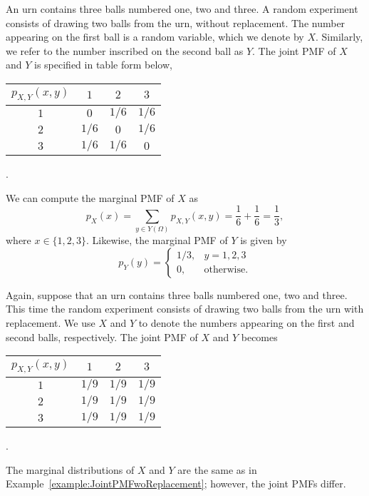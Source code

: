 \begin{example} \label{example:JointPMFwoReplacement}
An urn contains three balls numbered one, two and three.
A random experiment consists of drawing two balls from the urn, without replacement.
The number appearing on the first ball is a random variable, which we denote by $X$.
Similarly, we refer to the number inscribed on the second ball as $Y$.
The joint PMF of $X$ and $Y$ is specified in table form below,
\begin{center}
\begin{tabular}{|c|c|c|c|}
\hline
$p_{X,Y} (x,y)$ & $1$ & $2$ & $3$ \\
\hline
$1$ & $0$ & $1/6$ & $1/6$ \\
\hline
$2$ & $1/6$ & $0$ & $1/6$ \\
\hline
$3$ & $1/6$ & $1/6$ & $0$ \\
\hline
\end{tabular} .
\end{center}
We can compute the marginal PMF of $X$ as
\begin{equation*}
p_X (x) = \sum_{y \in Y(\Omega)} p_{X,Y} (x,y)
= \frac{1}{6} + \frac{1}{6} = \frac{1}{3},
\end{equation*}
where $x \in \{1, 2, 3 \}$.
Likewise, the marginal PMF of $Y$ is given by
\begin{equation*}
p_Y (y) = \begin{cases}
1/3, & y = 1, 2, 3 \\
0, & \text{otherwise} .
\end{cases}
\end{equation*}
\end{example}

\begin{example} \label{example:JointPMFwithReplacement}
Again, suppose that an urn contains three balls numbered one, two and three.
This time the random experiment consists of drawing two balls from the urn with replacement.
We use $X$ and $Y$ to denote the numbers appearing on the first and second balls, respectively.
The joint PMF of $X$ and $Y$ becomes
\begin{center}
\begin{tabular}{|c|c|c|c|}
\hline
$p_{X,Y} (x,y)$ & $1$ & $2$ & $3$ \\
\hline
$1$ & $1/9$ & $1/9$ & $1/9$ \\
\hline
$2$ & $1/9$ & $1/9$ & $1/9$ \\
\hline
$3$ & $1/9$ & $1/9$ & $1/9$ \\
\hline
\end{tabular} .
\end{center}
The marginal distributions of $X$ and $Y$ are the same as in Example~\ref{example:JointPMFwoReplacement};
however, the joint PMFs differ.
\end{example}


